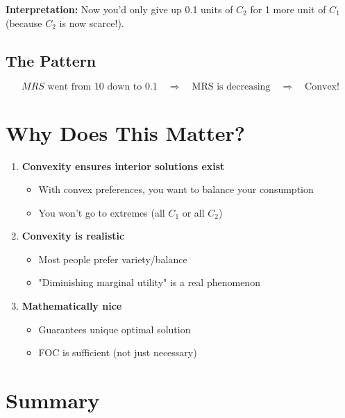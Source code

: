\documentclass[12pt]{article}
\begin{document}
\textbf{Interpretation:} Now you'd only give up 0.1 units of $C_2$ for 1 more unit of $C_1$ (because $C_2$ is now scarce!).

\subsection*{The Pattern}

\[
MRS \text{ went from } 10 \text{ down to } 0.1 \quad \Rightarrow \quad \text{MRS is decreasing} \quad \Rightarrow \quad \text{Convex!}
\]

\section*{Why Does This Matter?}

\begin{enumerate}[leftmargin=*]
\item \textbf{Convexity ensures interior solutions exist}
\begin{itemize}
\item With convex preferences, you want to balance your consumption
\item You won't go to extremes (all $C_1$ or all $C_2$)
\end{itemize}

\item \textbf{Convexity is realistic}
\begin{itemize}
\item Most people prefer variety/balance
\item "Diminishing marginal utility" is a real phenomenon
\end{itemize}

\item \textbf{Mathematically nice}
\begin{itemize}
\item Guarantees unique optimal solution
\item FOC is sufficient (not just necessary)
\end{itemize}
\end{enumerate}

\newpage

\section*{Summary}
\end{document}
